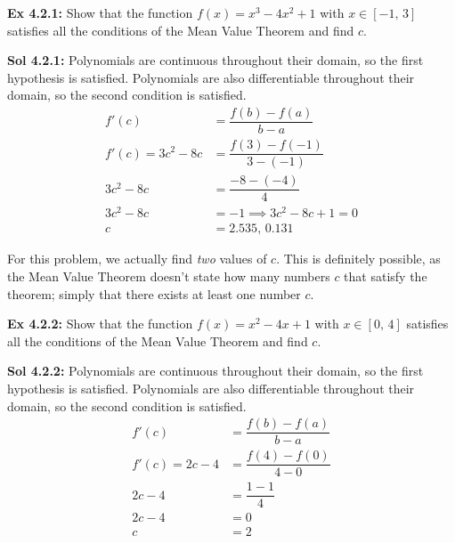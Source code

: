\begin{tcolorbox}[example]
    \textbf{Ex 4.2.1: } Show that the function $f(x) = x^3 - 4x^2 + 1$ with $x \in [-1, \, 3]$ satisfies all the conditions of the Mean Value Theorem and find $c$.
\end{tcolorbox}
\begin{tcolorbox}[solution]
    \textbf{Sol 4.2.1: } Polynomials are continuous throughout their domain, so the first hypothesis is satisfied. Polynomials are also differentiable throughout their domain, so the second condition is satisfied. \begin{align*}
        f'(c) &= \dfrac{f(b) - f(a)}{b - a} \\[11pt]
        f'(c) = 3c^2 - 8c &= \dfrac{f(3) - f(-1)}{3 - (-1)} \\[11pt]
        3c^2 - 8c &= \dfrac{-8 - (-4)}{4} \\[11pt]
        3c^2 - 8c &= -1 \implies 3c^2 - 8c + 1 = 0 \\[11pt]
        c &= \boxed{2.535, \, 0.131}
    \end{align*}
    \begin{tcolorbox}[interesting]
        For this problem, we actually find \textit{two} values of $c$. This is definitely possible, as the Mean Value Theorem doesn't state how many numbers $c$ that satisfy the theorem; simply that there exists at least one number $c$.
    \end{tcolorbox}
\end{tcolorbox} \vspace{11pt}

\begin{tcolorbox}[example]
    \textbf{Ex 4.2.2: } Show that the function $f(x) = x^2 - 4x + 1$ with $x \in [0, \, 4]$ satisfies all the conditions of the Mean Value Theorem and find $c$.
\end{tcolorbox}
\begin{tcolorbox}[solution]
    \textbf{Sol 4.2.2: } Polynomials are continuous throughout their domain, so the first hypothesis is satisfied. Polynomials are also differentiable throughout their domain, so the second condition is satisfied. \begin{align*}
        f'(c) &= \dfrac{f(b) - f(a)}{b - a} \\[11pt]
        f'(c) = 2c - 4 &= \dfrac{f(4) - f(0)}{4 - 0} \\[11pt]
        2c - 4 &= \dfrac{1 - 1}{4} \\[11pt]
        2c - 4 &= 0 \\[11pt]
        c &= \boxed{2}
    \end{align*}
\end{tcolorbox}

